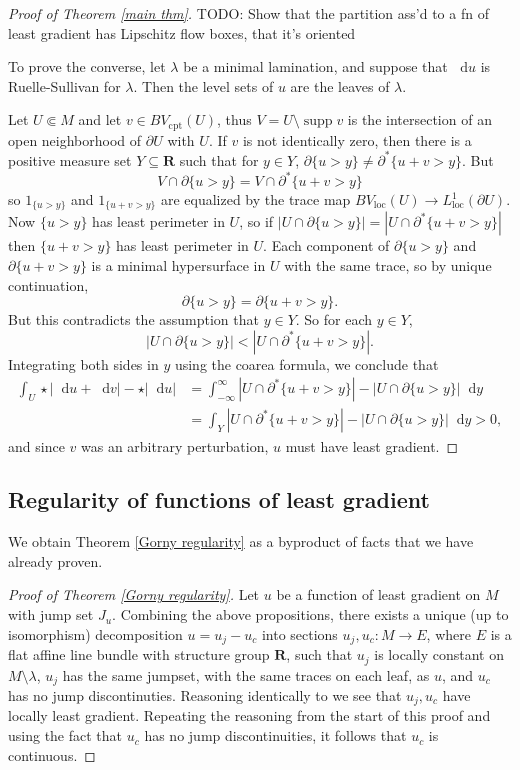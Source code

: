 \documentclass[reqno,10pt]{amsart}
\newcommand{\RR}{\mathbf{R}}
\DeclareMathOperator{\supp}{supp}
\newcommand*\dif{\mathop{}\!\mathrm{d}}
\newcommand{\loc}{\mathrm{loc}}
\newcommand{\cpt}{\mathrm{cpt}}
\theoremstyle{definition}
\numberwithin{equation}{section}
\begin{document}
\begin{proof}[Proof of Theorem \ref{main thm}]
TODO: Show that the partition ass'd to a fn of least gradient has Lipschitz flow boxes, that it's oriented

To prove the converse, let $\lambda$ be a minimal lamination, and suppose that $\dif u$ is Ruelle-Sullivan for $\lambda$.
Then the level sets of $u$ are the leaves of $\lambda$.

Let $U \Subset M$ and let $v \in BV_\cpt(U)$, thus $V = U \setminus \supp v$ is the intersection of an open neighborhood of $\partial U$ with $U$.
If $v$ is not identically zero, then there is a positive measure set $Y \subseteq \RR$ such that for $y \in Y$, $\partial \{u > y\} \neq \partial^* \{u + v > y\}$.
But
$$V \cap \partial \{u > y\} = V \cap \partial^* \{u + v > y\}$$
so $1_{\{u > y\}}$ and $1_{\{u + v > y\}}$ are equalized by the trace map $BV_\loc(U) \to L^1_\loc(\partial U)$.
Now $\{u > y\}$ has least perimeter in $U$, so if $|U \cap \partial \{u > y\}| = |U \cap \partial^* \{u + v > y\}|$ then $\{u + v > y\}$ has least perimeter in $U$. 
Each component of $\partial \{u > y\}$ and $\partial \{u + v > y\}$ is a minimal hypersurface in $U$ with the same trace, so by unique continuation,
$$\partial \{u > y\} = \partial \{u + v > y\}.$$
But this contradicts the assumption that $y \in Y$. So for each $y \in Y$,
$$|U \cap \partial \{u > y\}| < |U \cap \partial^* \{u + v > y\}|.$$
Integrating both sides in $y$ using the coarea formula, we conclude that 
\begin{align*}
\int_U \star |\dif u + \dif v| - \star |\dif u| &= \int_{-\infty}^\infty |U \cap \partial^* \{u + v > y\}| - |U \cap \partial \{u > y\}| \dif y \\
&= \int_Y |U \cap \partial^* \{u + v > y\}| - |U \cap \partial \{u > y\}| \dif y > 0,
\end{align*}
and since $v$ was an arbitrary perturbation, $u$ must have least gradient.
\end{proof}

\subsection{Regularity of functions of least gradient}
We obtain Theorem \ref{Gorny regularity} as a byproduct of facts that we have already proven.

\begin{proof}[Proof of Theorem \ref{Gorny regularity}]
Let $u$ be a function of least gradient on $M$ with jump set $J_u$.
Combining the above propositions, there exists a unique (up to isomorphism) decomposition $u = u_j - u_c$ into sections $u_j, u_c: M \to E$, where $E$ is a flat affine line bundle with structure group $\RR$, such that $u_j$ is locally constant on $M \setminus \lambda$, $u_j$ has the same jumpset, with the same traces on each leaf, as $u$, and $u_c$ has no jump discontinuties.
Reasoning identically to \cite[pg11]{górny2017planar} we see that $u_j, u_c$ have locally least gradient.
Repeating the reasoning from the start of this proof and using the fact that $u_c$ has no jump discontinuities, it follows that $u_c$ is continuous.
\end{proof}
\end{document}

